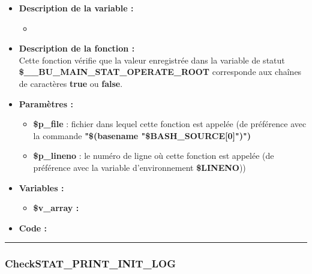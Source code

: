 \documentclass[a4paper,10pt]{article}
\begin{document}
\begin{itemize}
    \item \textbf{Description de la variable :}
    \begin{itemize}
        \item \textbf{}\\[1\baselineskip]
    \end{itemize}


    \item \textbf{Description de la fonction :}\\
        Cette fonction vérifie que la valeur enregistrée dans la variable de statut\\ \textbf{\color{orange}\$\_\_BU\_MAIN\_STAT\_OPERATE\_ROOT} corresponde aux chaînes de caractères \textbf{true} ou \textbf{false}.\\[1\baselineskip]

    \item \textbf{Paramètres :}
    \begin{itemize}
        \item \color{orange}\textbf{\$p\_file}\color{white} : fichier dans lequel cette fonction est appelée (de préférence avec la commande \textbf{"\$(\color{gray}basename \color{white}"\color{orange}\$BASH\_SOURCE[0]\color{white}")")}\\[1\baselineskip]

        \item \color{orange}\textbf{\$p\_lineno}\color{white} : le numéro de ligne où cette fonction est appelée (de préférence avec la variable d'environnement \textbf{\color{orange}\$LINENO}))\\[1\baselineskip]
    \end{itemize}

    \item \textbf{Variables :}
    \begin{itemize}
        \item \textbf{\color{orange}\$v\_array\color{white} :}\\[1\baselineskip]
    \end{itemize}


    \item \textbf{Code :}
\end{itemize}


\color{blue}\par\noindent\rule{\textwidth}{0.4pt}\color{white}

\color{blue}
\subsubsection{CheckSTAT\_PRINT\_INIT\_LOG}\color{white}
\end{document}
